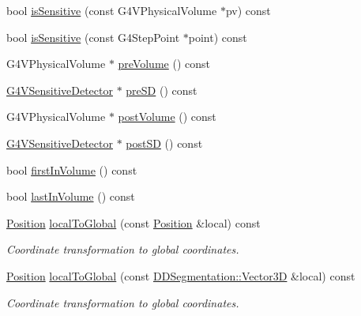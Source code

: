 \begin{DoxyCompactItemize}
bool \hyperlink{class_d_d4hep_1_1_simulation_1_1_geant4_step_handler_afdd1be009c5f8aa81de959a8fc8c6f7d}{isSensitive} (const G4VPhysicalVolume $\ast$pv) const 
\item 
bool \hyperlink{class_d_d4hep_1_1_simulation_1_1_geant4_step_handler_ac3fdad18d7737b2c7b44969ccba8cb24}{isSensitive} (const G4StepPoint $\ast$point) const 
\item 
G4VPhysicalVolume $\ast$ \hyperlink{class_d_d4hep_1_1_simulation_1_1_geant4_step_handler_a39eab28ff81a1a24daea4b6a1e376dea}{preVolume} () const 
\item 
\hyperlink{class_g4_v_sensitive_detector}{G4VSensitiveDetector} $\ast$ \hyperlink{class_d_d4hep_1_1_simulation_1_1_geant4_step_handler_afa4f53d4d2e41898f948baf79fabd29b}{preSD} () const 
\item 
G4VPhysicalVolume $\ast$ \hyperlink{class_d_d4hep_1_1_simulation_1_1_geant4_step_handler_a0d568a83cad6f9cb0a300c0426c551da}{postVolume} () const 
\item 
\hyperlink{class_g4_v_sensitive_detector}{G4VSensitiveDetector} $\ast$ \hyperlink{class_d_d4hep_1_1_simulation_1_1_geant4_step_handler_a9974306f45eb485f2463808f0dd96280}{postSD} () const 
\item 
bool \hyperlink{class_d_d4hep_1_1_simulation_1_1_geant4_step_handler_af92e626fd9c595d566a2ad50dc309fd0}{firstInVolume} () const 
\item 
bool \hyperlink{class_d_d4hep_1_1_simulation_1_1_geant4_step_handler_accb8e37cbde988e9c4b2da379d28779e}{lastInVolume} () const 
\item 
\hyperlink{namespace_d_d4hep_1_1_simulation_ad6fd94b3439e31d1ba4b2e640d578558}{Position} \hyperlink{class_d_d4hep_1_1_simulation_1_1_geant4_step_handler_a4287f0adeca49bd4a4e6c5bc1054e1a1}{localToGlobal} (const \hyperlink{namespace_d_d4hep_1_1_simulation_ad6fd94b3439e31d1ba4b2e640d578558}{Position} \&local) const 
\begin{DoxyCompactList}\small\item\em Coordinate transformation to global coordinates. \item\end{DoxyCompactList}\item 
\hyperlink{namespace_d_d4hep_1_1_simulation_ad6fd94b3439e31d1ba4b2e640d578558}{Position} \hyperlink{class_d_d4hep_1_1_simulation_1_1_geant4_step_handler_aa2d8418b5a6009da51dc6c70cb7c22f2}{localToGlobal} (const \hyperlink{struct_d_d4hep_1_1_d_d_segmentation_1_1_vector3_d}{DDSegmentation::Vector3D} \&local) const 
\begin{DoxyCompactList}\small\item\em Coordinate transformation to global coordinates. \item\end{DoxyCompactList}\item 

\end{DoxyCompactItemize}

